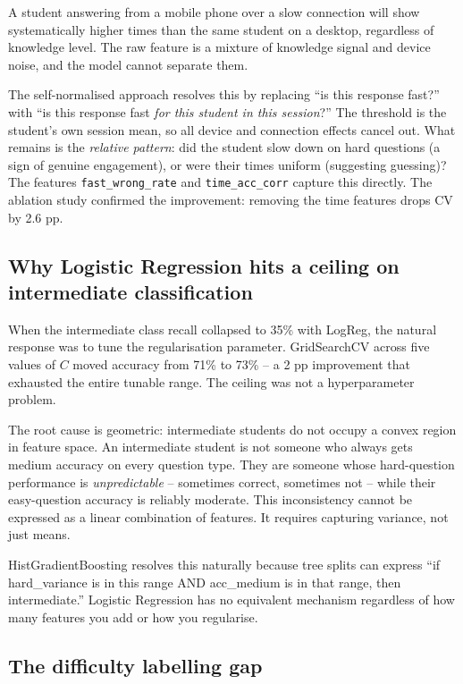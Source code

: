 \documentclass[12pt,a4paper]{article}
\begin{document}
A student answering from a mobile phone over a slow connection will show systematically
higher times than the same student on a desktop, regardless of knowledge level.
The raw feature is a mixture of knowledge signal and device noise, and the model
cannot separate them.

The self-normalised approach resolves this by replacing ``is this response fast?''
with ``is this response fast \emph{for this student in this session}?'' The threshold
is the student's own session mean, so all device and connection effects cancel out.
What remains is the \emph{relative pattern}: did the student slow down on hard
questions (a sign of genuine engagement), or were their times uniform (suggesting
guessing)? The features \texttt{fast\_wrong\_rate} and \texttt{time\_acc\_corr}
capture this directly. The ablation study confirmed the improvement: removing the
time features drops CV by 2.6 pp.

\subsection{Why Logistic Regression hits a ceiling on intermediate classification}

When the intermediate class recall collapsed to 35\% with LogReg, the natural
response was to tune the regularisation parameter. GridSearchCV across five values
of $C$ moved accuracy from 71\% to 73\% -- a 2 pp improvement that exhausted the
entire tunable range. The ceiling was not a hyperparameter problem.

The root cause is geometric: intermediate students do not occupy a convex region in
feature space. An intermediate student is not someone who always gets medium accuracy
on every question type. They are someone whose hard-question performance is
\emph{unpredictable} -- sometimes correct, sometimes not -- while their easy-question
accuracy is reliably moderate. This inconsistency cannot be expressed as a linear
combination of features. It requires capturing variance, not just means.

HistGradientBoosting resolves this naturally because tree splits can express
``if hard\_variance is in this range AND acc\_medium is in that range, then
intermediate.'' Logistic Regression has no equivalent mechanism regardless of how
many features you add or how you regularise.

\subsection{The difficulty labelling gap}
\end{document}
